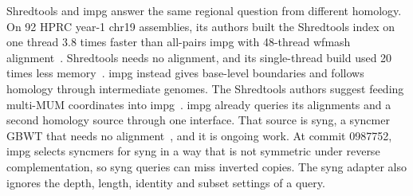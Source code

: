 Shredtools and impg answer the same regional question from different homology.
On 92 HPRC year-1 chr19 assemblies, its authors built the Shredtools index on one thread 3.8 times faster than all-pairs impg with 48-thread wfmash alignment~\citep{Shivakumar2026shredtools}.
Shredtools needs no alignment, and its single-thread build used 20 times less memory~\citep{Shivakumar2026shredtools}.
impg instead gives base-level boundaries and follows homology through intermediate genomes.
The Shredtools authors suggest feeding multi-MUM coordinates into impg~\citep{Shivakumar2026shredtools}.
impg already queries its alignments and a second homology source through one interface.
That source is syng, a syncmer GBWT that needs no alignment~\citep{Durbin2026syng}, and it is ongoing work.
At commit 0987752, impg selects syncmers for syng in a way that is not symmetric under reverse complementation, so syng queries can miss inverted copies.
The syng adapter also ignores the depth, length, identity and subset settings of a query.

